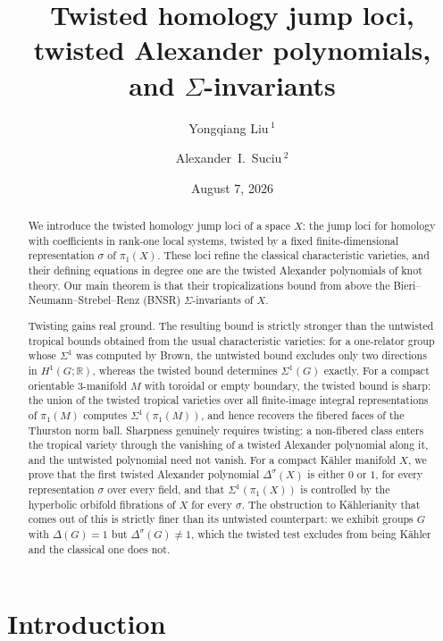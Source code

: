 \documentclass[11pt]{amsart}
\title[Twisted homology jump loci and $\Sigma$-invariants]%
{Twisted homology jump loci, twisted Alexander polynomials, and $\Sigma$-invariants}
\author[Yongqiang Liu]{Yongqiang Liu\,$^1$}
\author[Alexander~I.~Suciu]{Alexander~I.~Suciu\,$^2$\!\orcidA{}}
\date{August 7, 2026}
\theoremstyle{definition}
\newcommand{\R}{\mathbb{R}}
\begin{document}
\begin{abstract}
We introduce the twisted homology jump loci of a space $X$: the jump
loci for homology with coefficients in rank-one local systems, twisted
by a fixed finite-dimensional representation $\sigma$ of $\pi_1(X)$.
These loci refine the classical characteristic varieties, and their
defining equations in degree one are the twisted Alexander polynomials
of knot theory. Our main theorem is that their tropicalizations bound
from above the Bieri--Neumann--Strebel--Renz (BNSR) $\Sigma$-invariants
of $X$.

Twisting gains real ground. The resulting bound is strictly stronger
than the untwisted tropical bounds obtained from the usual
characteristic varieties: for a one-relator group whose $\Sigma^1$ was
computed by Brown, the untwisted bound excludes only two directions in
$H^1(G;\R)$, whereas the twisted bound determines $\Sigma^1(G)$ exactly.
For a compact orientable $3$-manifold $M$ with toroidal or empty
boundary, the twisted bound is sharp: the union of the twisted tropical
varieties over all finite-image integral representations of $\pi_1(M)$
computes $\Sigma^1(\pi_1(M))$, and hence recovers the fibered faces of
the Thurston norm ball. Sharpness genuinely requires twisting: a
non-fibered class enters the tropical variety through the vanishing of a
twisted Alexander polynomial along it, and the untwisted polynomial need
not vanish. For a compact K\"{a}hler manifold $X$, we prove that the first
twisted Alexander polynomial $\Delta^{\sigma}(X)$ is either $0$ or $1$,
for every representation $\sigma$ over every field, and that
$\Sigma^1(\pi_1(X))$ is controlled by the hyperbolic orbifold
fibrations of $X$ for every $\sigma$. The obstruction to
K\"{a}hlerianity that comes out of this is strictly finer than its
untwisted counterpart: we exhibit groups $G$ with $\Delta(G)=1$ but
$\Delta^{\sigma}(G)\ne 1$, which the twisted test excludes from being
K\"{a}hler and the classical one does not.
\end{abstract}

\maketitle
\tableofcontents

\section{Introduction}
\label{sect:intro}
\end{document}
